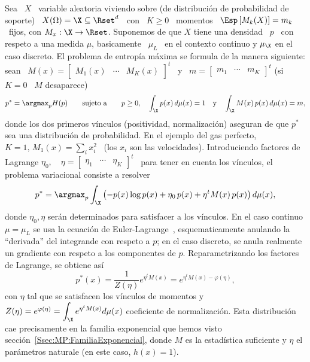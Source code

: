 Sea \ $X$ \ variable aleatoria viviendo sobre (de distribuci\'on de probabilidad
de soporte) \ $X(\Omega) = \X \subseteq \Rset^d$  \ con \ $K \ge 0$ \ momentos \
$\Esp\left[ M_k(X) \right] = m_k$ \ fijos, con $M_x: \X \to \Rset$. Suponemos de
que $X$ tiene una densidad \ $p$ \ con respeto a una medida $\mu$, basicamente \
$\mu_L$ \ en el contexto continuo y $\mu_\X$ en el caso discreto. El problema de
entrop\'ia  m\'axima   se  formula  de   la  manera  siguiente:  sean   \  $M(x)
=  \begin{bmatrix}  M_1(x)  &  \cdots   &  M_K(x)  \end{bmatrix}^t$  \  y  \  $m
=  \begin{bmatrix} m_1  &  \cdots  & m_K  \end{bmatrix}^t$  (si $K  =  0$ \  $M$
desaparece)
%
\[
p^* = \argmax_p H(p) \qquad \mbox{sujeto a} \qquad p \ge 0, \quad \int_\X p(x) \, d\mu(x) = 1 \quad \mbox{y} 
\quad \int_\X M(x) \, p(x) \, d\mu(x) = m,
\]
%
donde los dos primeros v\'inculos (positividad, normalizaci\'on) aseguran de que
$p^*$ sea una distribuci\'on de probabilidad. En el ejemplo del gas perfecto, $K
= 1, \, M_1(x) = \sum_i  x_i^2$ \ (los $x_i$ son las velocidades). Introduciendo
factores de  Lagrange $\eta_0,  \quad \eta =  \begin{bmatrix} \eta_1 &  \cdots &
  \eta_K \end{bmatrix}^t$  \ para  tener en cuenta  los v\'inculos,  el problema
variacional   consiste  a   resolver~\cite{GelFom63,  Bru04,   Mil00,  CamMar09,
  CovTho06}
%
\[
p^* = \argmax_p \int_\X  \left( - p(x) \log p(x) + \eta_0  \, p(x) + \eta^t M(x)
  \, p(x) \right) d\mu(x),
\]
%
donde $\eta_0, \eta$ ser\'an determinados  para satisfacer a los v\'inculos.  En
el    caso   continuo    $\mu   =    \mu_L$    se   usa    la   ecuaci\'on    de
Euler-Lagrange~\cite{GelFom63, Bru04}, esquematicamente anulando la ``derivada''
del integrande  con respeto a  $p$; en el  caso discreto, se anula  realmente un
gradiente con respeto a los componentes de $p$. Reparametrizando los factores de
Lagrange, se obtiene as\'i
%
\[
p^*(x) = \frac{1}{Z(\eta)} e^{\eta^t M(x)} = e^{\eta^t M(x) - \varphi(\eta)},
\]
%
con  $\eta$ tal que  se satisfacen  los v\'inculos  de momentos  y \  $Z(\eta) =
e^{\varphi(\eta)} =  \displaystyle \int_\X e^{\eta^t  M(x)} d\mu(x)$ coeficiente
de  normalizaci\'on.   Esta  distribuci\'on   cae  precisamente  en  la  familia
exponencial  que hemos  visto  secci\'on~\ref{Ssec:MP:FamiliaExponencial}, donde
$M$ es  la estad\'istica suficiente y  $\eta$ el par\'ametros  naturale (en este
caso, $h(x) = 1$).


